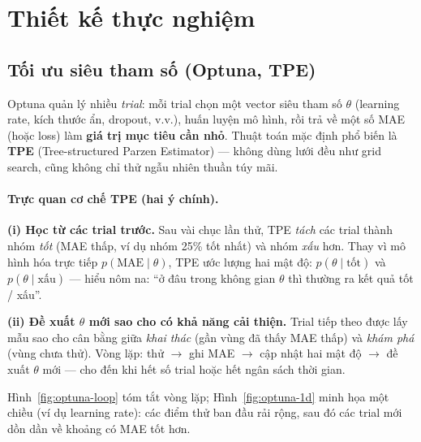\documentclass[12pt,a4paper]{article}
\begin{document}
\section{Thiết kế thực nghiệm}

\subsection{Tối ưu siêu tham số (Optuna, TPE)}
Optuna quản lý nhiều \emph{trial}: mỗi trial chọn một vector siêu tham số $\theta$ (learning rate, kích thước ẩn, dropout, v.v.), huấn luyện mô hình, rồi trả về một số MAE (hoặc loss) làm \textbf{giá trị mục tiêu cần nhỏ}. Thuật toán mặc định phổ biến là \textbf{TPE} (Tree-structured Parzen Estimator) --- không dùng lưới đều như grid search, cũng không chỉ thử ngẫu nhiên thuần túy mãi.

\paragraph{Trực quan cơ chế TPE (hai ý chính).}
\textbf{(i) Học từ các trial trước.} Sau vài chục lần thử, TPE \emph{tách} các trial thành nhóm \emph{tốt} (MAE thấp, ví dụ nhóm 25\% tốt nhất) và nhóm \emph{xấu} hơn. Thay vì mô hình hóa trực tiếp $p(\mathrm{MAE}\mid\theta)$, TPE ước lượng hai mật độ: $p(\theta\mid \mathrm{tốt})$ và $p(\theta\mid \mathrm{xấu})$ --- hiểu nôm na: ``ở đâu trong không gian $\theta$ thì thường ra kết quả tốt / xấu''.

\textbf{(ii) Đề xuất $\theta$ mới sao cho có khả năng cải thiện.} Trial tiếp theo được lấy mẫu sao cho cân bằng giữa \emph{khai thác} (gần vùng đã thấy MAE thấp) và \emph{khám phá} (vùng chưa thử). Vòng lặp: thử $\to$ ghi MAE $\to$ cập nhật hai mật độ $\to$ đề xuất $\theta$ mới --- cho đến khi hết số trial hoặc hết ngân sách thời gian.

Hình~\ref{fig:optuna-loop} tóm tắt vòng lặp; Hình~\ref{fig:optuna-1d} minh họa một chiều (ví dụ learning rate): các điểm thử ban đầu rải rộng, sau đó các trial mới dồn dần về khoảng có MAE tốt hơn.
\end{document}
